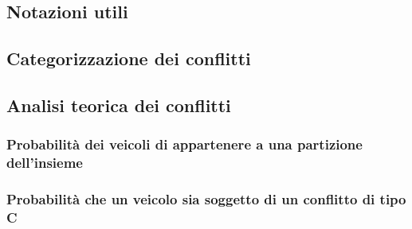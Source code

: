 \documentclass[../relazione.tex]{subfiles}
\begin{document}
\subsection{Notazioni utili}


\subsection{Categorizzazione dei conflitti}


\subsection{Analisi teorica dei conflitti}
\subsubsection{Probabilità dei veicoli di appartenere a una partizione dell'insieme}

\subsubsection{Probabilità che un veicolo sia soggetto di un conflitto di tipo C}

\end{document}
